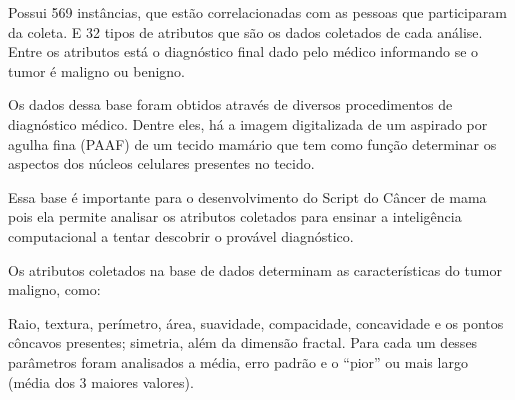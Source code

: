 Possui 569 instâncias, que estão correlacionadas com as pessoas que participaram da coleta.
E 32 tipos de atributos que são os dados coletados de cada análise.
Entre os atributos está o diagnóstico final dado pelo médico informando se o tumor é maligno ou benigno.

Os dados dessa base foram obtidos através de diversos procedimentos de diagnóstico médico.
Dentre eles, há a imagem digitalizada de um aspirado por agulha fina (PAAF)
de um tecido mamário que tem como função determinar os aspectos dos núcleos celulares presentes no tecido.

Essa base é importante para o desenvolvimento do Script do Câncer de mama
pois ela permite analisar os atributos coletados para ensinar a inteligência computacional a tentar descobrir o provável diagnóstico.

Os atributos coletados na base de dados determinam as características do tumor maligno, como:

Raio, textura, perímetro, área, suavidade, compacidade, concavidade e os pontos côncavos presentes;
simetria, além da dimensão fractal.
Para cada um desses parâmetros foram analisados a média, erro padrão e o ``pior'' ou mais largo (média dos 3 maiores valores).



